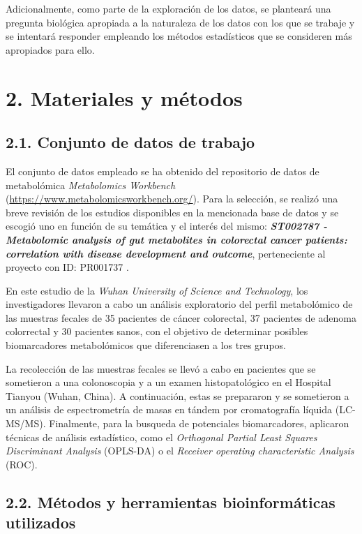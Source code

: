 \documentclass[
]{article}
\begin{document}
Adicionalmente, como parte de la exploración de los datos, se planteará
una pregunta biológica apropiada a la naturaleza de los datos con los
que se trabaje y se intentará responder empleando los métodos
estadísticos que se consideren más apropiados para ello.

\section{2. Materiales y métodos}\label{materiales-y-muxe9todos}

\subsection{2.1. Conjunto de datos de
trabajo}\label{conjunto-de-datos-de-trabajo}

El conjunto de datos empleado se ha obtenido del repositorio de datos de
metabolómica \emph{Metabolomics Workbench}
(\url{https://www.metabolomicsworkbench.org/}). Para la selección, se
realizó una breve revisión de los estudios disponibles en la mencionada
base de datos y se escogió uno en función de su temática y el interés
del mismo: \textbf{\emph{ST002787 - Metabolomic analysis of gut
metabolites in colorectal cancer patients: correlation with disease
development and outcome}}, perteneciente al proyecto con ID: PR001737
\citep{PR001737}.

En este estudio de la \emph{Wuhan University of Science and Technology},
los investigadores llevaron a cabo un análisis exploratorio del perfil
metabolómico de las muestras fecales de 35 pacientes de cáncer
colorectal, 37 pacientes de adenoma colorrectal y 30 pacientes sanos,
con el objetivo de determinar posibles biomarcadores metabolómicos que
diferenciasen a los tres grupos.

La recolección de las muestras fecales se llevó a cabo en pacientes que
se sometieron a una colonoscopia y a un examen histopatológico en el
Hospital Tianyou (Wuhan, China). A continuación, estas se prepararon y
se sometieron a un análisis de espectrometría de masas en tándem por
cromatografía líquida (LC-MS/MS). Finalmente, para la busqueda de
potenciales biomarcadores, aplicaron técnicas de análisis estadístico,
como el \emph{Orthogonal Partial Least Squares Discriminant Analysis}
(OPLS-DA) o el \emph{Receiver operating characteristic Analysis} (ROC).

\subsection{2.2. Métodos y herramientas bioinformáticas
utilizados}\label{muxe9todos-y-herramientas-bioinformuxe1ticas-utilizados}
\end{document}
